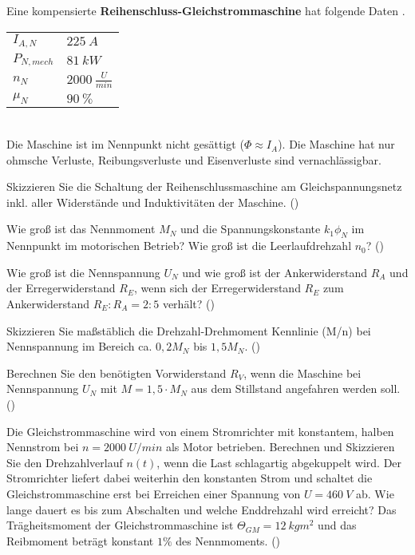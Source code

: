 \begin{question}[section=2,name={21.2.2017},mode=exm,type=bsp,tags={20170221}]
	Eine kompensierte \textbf{Reihenschluss-Gleichstrommaschine} hat folgende Daten .
	\begin{tabular}{L{2cm}l}
		$I_{A,N}$ \dotfill &$225~A$\\
		$P_{N,mech}$ \dotfill & $81~kW$ \\
		$n_N$ \dotfill & $2000~\frac{U}{min}$\\
		$\mu_{N}$ \dotfill & $90~\%$\\
	\end{tabular}\\
	Die Maschine ist im Nennpunkt nicht gesättigt ($\Phi \approx I_A$). Die Maschine hat nur ohmsche Verluste, Reibungsverluste und Eisenverluste sind vernachlässigbar.
	\begin{compactenum}
		\item Skizzieren Sie die Schaltung der Reihenschlussmaschine am Gleichspannungsnetz inkl. aller Widerstände und Induktivitäten der Maschine. ()
		\item Wie groß ist das Nennmoment $M_N$ und die Spannungskonstante $k_1 \phi_N$ im Nennpunkt im motorischen Betrieb? Wie groß ist die Leerlaufdrehzahl $n_0$? ()
		\item Wie groß ist die Nennspannung $U_N$ und wie groß ist der Ankerwiderstand $R_A$ und der Erregerwiderstand $R_E$, wenn sich der Erregerwiderstand $R_E$ zum Ankerwiderstand $R_E:R_A = 2:5$ verhält? ()
		\item Skizzieren Sie maßstäblich die Drehzahl-Drehmoment Kennlinie (M/n) bei Nennspannung im Bereich ca. $0,2 M_N$ bis $1,5 M_N$. ()
		\item Berechnen Sie den benötigten Vorwiderstand $R_V$, wenn die Maschine bei Nennspannung $U_N$ mit $M=1,5 \cdot M_N$ aus dem Stillstand angefahren werden soll. ()
		\item Die Gleichstrommaschine wird von einem Stromrichter mit konstantem, halben Nennstrom bei $n=2000~U/min$ als Motor betrieben. Berechnen und Skizzieren Sie den Drehzahlverlauf $n(t)$, wenn die Last schlagartig abgekuppelt wird. Der Stromrichter liefert dabei weiterhin den konstanten Strom und schaltet die Gleichstrommaschine erst bei Erreichen einer Spannung von $U=460~V$ ab. Wie lange dauert es bis zum Abschalten und welche Enddrehzahl wird erreicht? Das Trägheitsmoment der Gleichstrommaschine ist $\Theta_{GM} = 12~kgm^2$ und das Reibmoment beträgt konstant $1 \%$ des Nennmoments. ()
	\end{compactenum}
\end{question}
\begin{solution}
	
\end{solution}